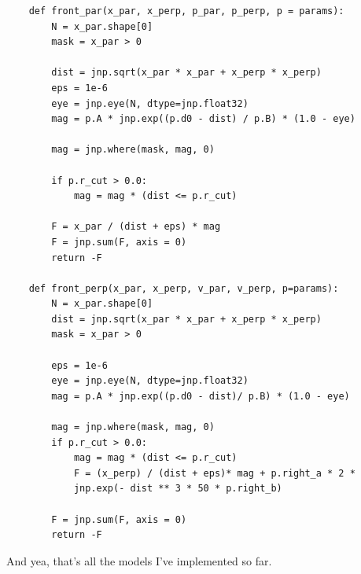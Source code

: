 \documentclass{article}
\begin{document}
\begin{lstlisting}
    def front_par(x_par, x_perp, p_par, p_perp, p = params):
        N = x_par.shape[0]
        mask = x_par > 0

        dist = jnp.sqrt(x_par * x_par + x_perp * x_perp)
        eps = 1e-6
        eye = jnp.eye(N, dtype=jnp.float32)
        mag = p.A * jnp.exp((p.d0 - dist) / p.B) * (1.0 - eye)

        mag = jnp.where(mask, mag, 0)

        if p.r_cut > 0.0:
            mag = mag * (dist <= p.r_cut)

        F = x_par / (dist + eps) * mag 
        F = jnp.sum(F, axis = 0)
        return -F

    def front_perp(x_par, x_perp, v_par, v_perp, p=params):
        N = x_par.shape[0]
        dist = jnp.sqrt(x_par * x_par + x_perp * x_perp)
        mask = x_par > 0

        eps = 1e-6
        eye = jnp.eye(N, dtype=jnp.float32)
        mag = p.A * jnp.exp((p.d0 - dist)/ p.B) * (1.0 - eye)

        mag = jnp.where(mask, mag, 0)
        if p.r_cut > 0.0:
            mag = mag * (dist <= p.r_cut)
            F = (x_perp) / (dist + eps)* mag + p.right_a * 2 * 
            jnp.exp(- dist ** 3 * 50 * p.right_b)
        
        F = jnp.sum(F, axis = 0)
        return -F
\end{lstlisting}

And yea, that's all the models I've implemented so far. 
\end{document}
